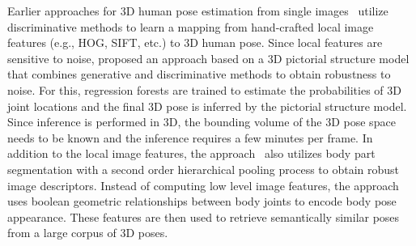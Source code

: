 \documentclass[10pt,journal,compsoc]{IEEEtran}
\begin{document}
Earlier approaches for 3D human pose estimation from single images~\cite{Bo-2010, AgarwalT-2004,Sminchisescu-2005,Agarwal:2006, bo2008fast, mori2006recovering} 
utilize discriminative methods to learn a mapping from hand-crafted local image features (e.g., HOG, SIFT, etc.) to 3D human pose. 
Since local features are sensitive to noise, \cite{Ilya_2014} proposed an approach based on a 3D pictorial structure model that 
combines generative and discriminative methods to obtain robustness to noise. For this, regression forests are trained to estimate
the probabilities of 3D joint locations and the final 3D pose is inferred by the pictorial structure model. 
Since inference is performed in 3D, the bounding volume of the 3D pose space needs to be known and the inference 
requires a few minutes per frame. In addition to the local image features, the approach~\cite{ics-cvpr14} also utilizes body part segmentation 
with a second order hierarchical pooling process to obtain robust image descriptors. Instead of computing low level image features,
the approach~\cite{Pons-Moll_2014_CVPR} uses boolean geometric relationships between body joints to encode body pose appearance. These features
are then used to retrieve semantically similar poses from a large corpus of 3D poses. 
\end{document}
